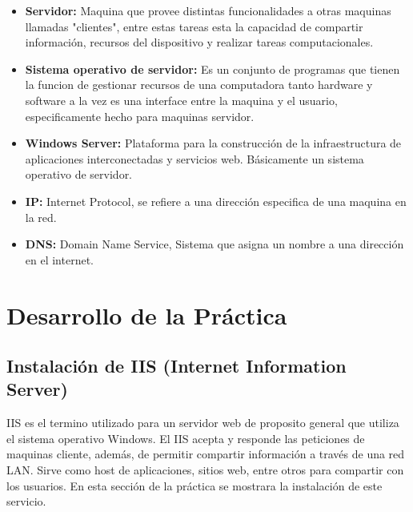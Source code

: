 \documentclass[letterpaper,12pt]{article} %
\begin{document}
\begin{itemize}
   \item \textbf{Servidor: } Maquina que provee distintas funcionalidades a otras maquinas llamadas "clientes", entre estas tareas esta la capacidad de compartir información, recursos del dispositivo y realizar tareas computacionales.

    \item \textbf{Sistema operativo de servidor: } Es un conjunto de programas que tienen la funcion de gestionar recursos de una computadora tanto hardware y software a la vez es una interface entre la maquina y el usuario, especificamente hecho para maquinas servidor.
    
    \item \textbf{Windows Server: } Plataforma para la construcción de la infraestructura de aplicaciones interconectadas y servicios web.\cite{MSServer} Básicamente un sistema operativo de servidor.
    
    \item \textbf{IP: }Internet Protocol, se refiere a una dirección especifica de una maquina en la red.\cite{comer2013internetworking}
    
    \item \textbf{DNS: } Domain Name Service, Sistema que asigna un nombre a una dirección en el internet.\cite{comer2013internetworking}
    
    
\end{itemize}



\section{Desarrollo de la Práctica}


\subsection{Instalación de IIS (Internet Information Server)}

IIS es el termino utilizado para un servidor web de proposito general que utiliza el sistema operativo Windows.
El IIS acepta y responde las peticiones de maquinas cliente, además, de permitir compartir información a través de una red LAN. Sirve como host de aplicaciones, sitios web, entre otros para compartir con los usuarios. En esta sección de la práctica se mostrara la instalación de este servicio.
\end{document}
